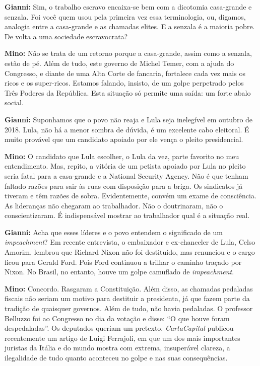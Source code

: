 \textbf{Gianni:} Sim, o trabalho escravo encaixa-se bem com a dicotomia
casa-grande e senzala. Foi você quem usou pela primeira vez essa
terminologia, ou, digamos, analogia entre a casa-grande e as chamadas
elites. E a senzala é a maioria pobre. De volta a uma sociedade
escravocrata?

\textbf{Mino:} Não se trata de um retorno porque a casa-grande, assim
como a senzala, estão de pé. Além de tudo, este governo de Michel Temer,
com a ajuda do Congresso, e diante de uma Alta Corte de fancaria,
fortalece cada vez mais os ricos e os super-ricos. Estamos falando,
insisto, de um golpe perpetrado pelos Três Poderes da República. Esta
situação só permite uma saída: um forte abalo social.

\textbf{Gianni:} Suponhamos que o povo não reaja e Lula seja inelegível
em outubro de 2018. Lula, não há a menor sombra de dúvida, é um
excelente cabo eleitoral. É muito provável que um candidato apoiado por
ele vença o pleito presidencial.

\textbf{Mino:} O candidato que Lula escolher, o Lula da vez, parte
favorito no meu entendimento. Mas, repito, a vitória de um petista
apoiado por Lula no pleito seria fatal para a casa-grande e a National
Security Agency. Não é que tenham faltado razões para sair às ruas com
disposição para a briga. Os sindicatos já tiveram e têm razões de sobra.
Evidentemente, convém um exame de consciência. As lideranças não
chegaram ao trabalhador. Não o doutrinaram, não o conscientizaram. É
indispensável mostrar ao trabalhador qual é a situação real.

\textbf{Gianni:} Acha que esses líderes e o povo entendem o significado
de um \emph{impeachment}? Em recente entrevista, o embaixador e
ex-chanceler de Lula, Celso Amorim, lembrou que Richard Nixon não foi
destituído, mas renunciou e o cargo ficou para Gerald Ford. Pois Ford
continuou a trilhar o caminho traçado por Nixon. No Brasil, no entanto,
houve um golpe camuflado de \emph{impeachment}.

\textbf{Mino:} Concordo. Rasgaram a Constituição. Além disso, as
chamadas pedaladas fiscais não seriam um motivo para destituir a
presidenta, já que fazem parte da tradição de quaisquer governos. Além
de tudo, não havia pedaladas. O professor Belluzzo foi ao Congresso no
dia da votação e disse: ``O que houve foram despedaladas''. Os deputados
queriam um pretexto. \emph{CartaCapital} publicou recentemente um artigo
de Luigi Ferrajoli, em que um dos mais importantes juristas da Itália e
do mundo mostra com extrema, insuperável clareza, a ilegalidade de tudo
quanto aconteceu no golpe e nas suas consequências.

